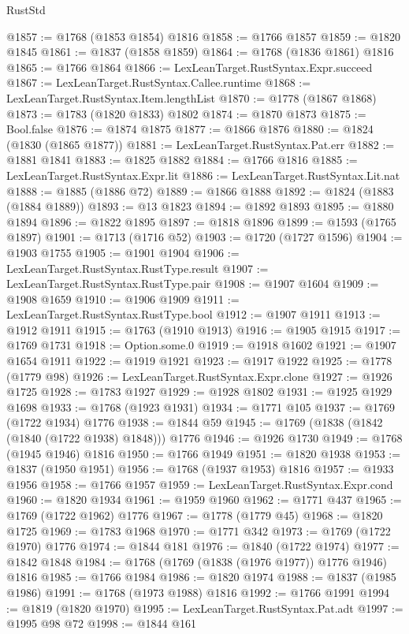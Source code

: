 \begin{lexlean}{RustStd}
\begin{coremodule}
@1857 := @1768 (@1853 @1854) @1816
@1858 := @1766 @1857
@1859 := @1820 @1845
@1861 := @1837 (@1858 @1859)
@1864 := @1768 (@1836 @1861) @1816
@1865 := @1766 @1864
@1866 := LexLeanTarget.RustSyntax.Expr.succeed
@1867 := LexLeanTarget.RustSyntax.Callee.runtime
@1868 := LexLeanTarget.RustSyntax.Item.lengthList
@1870 := @1778 (@1867 @1868)
@1873 := @1783 (@1820 @1833) @1802
@1874 := @1870 @1873
@1875 := Bool.false
@1876 := @1874 @1875
@1877 := @1866 @1876
@1880 := @1824 (@1830 (@1865 @1877))
@1881 := LexLeanTarget.RustSyntax.Pat.err
@1882 := @1881 @1841
@1883 := @1825 @1882
@1884 := @1766 @1816
@1885 := LexLeanTarget.RustSyntax.Expr.lit
@1886 := LexLeanTarget.RustSyntax.Lit.nat
@1888 := @1885 (@1886 @72)
@1889 := @1866 @1888
@1892 := @1824 (@1883 (@1884 @1889))
@1893 := @13 @1823
@1894 := @1892 @1893
@1895 := @1880 @1894
@1896 := @1822 @1895
@1897 := @1818 @1896
@1899 := @1593 (@1765 @1897)
@1901 := @1713 (@1716 @52)
@1903 := @1720 (@1727 @1596)
@1904 := @1903 @1755
@1905 := @1901 @1904
@1906 := LexLeanTarget.RustSyntax.RustType.result
@1907 := LexLeanTarget.RustSyntax.RustType.pair
@1908 := @1907 @1604
@1909 := @1908 @1659
@1910 := @1906 @1909
@1911 := LexLeanTarget.RustSyntax.RustType.bool
@1912 := @1907 @1911
@1913 := @1912 @1911
@1915 := @1763 (@1910 @1913)
@1916 := @1905 @1915
@1917 := @1769 @1731
@1918 := Option.some.{0}
@1919 := @1918 @1602
@1921 := @1907 @1654 @1911
@1922 := @1919 @1921
@1923 := @1917 @1922
@1925 := @1778 (@1779 @98)
@1926 := LexLeanTarget.RustSyntax.Expr.clone
@1927 := @1926 @1725
@1928 := @1783 @1927
@1929 := @1928 @1802
@1931 := @1925 @1929 @1698
@1933 := @1768 (@1923 @1931)
@1934 := @1771 @105
@1937 := @1769 (@1722 @1934) @1776
@1938 := @1844 @59
@1945 := @1769 (@1838 (@1842 (@1840 (@1722 @1938) @1848))) @1776
@1946 := @1926 @1730
@1949 := @1768 (@1945 @1946) @1816
@1950 := @1766 @1949
@1951 := @1820 @1938
@1953 := @1837 (@1950 @1951)
@1956 := @1768 (@1937 @1953) @1816
@1957 := @1933 @1956
@1958 := @1766 @1957
@1959 := LexLeanTarget.RustSyntax.Expr.cond
@1960 := @1820 @1934
@1961 := @1959 @1960
@1962 := @1771 @437
@1965 := @1769 (@1722 @1962) @1776
@1967 := @1778 (@1779 @45)
@1968 := @1820 @1725
@1969 := @1783 @1968
@1970 := @1771 @342
@1973 := @1769 (@1722 @1970) @1776
@1974 := @1844 @181
@1976 := @1840 (@1722 @1974)
@1977 := @1842 @1848
@1984 := @1768 (@1769 (@1838 (@1976 @1977)) @1776 @1946) @1816
@1985 := @1766 @1984
@1986 := @1820 @1974
@1988 := @1837 (@1985 @1986)
@1991 := @1768 (@1973 @1988) @1816
@1992 := @1766 @1991
@1994 := @1819 (@1820 @1970)
@1995 := LexLeanTarget.RustSyntax.Pat.adt
@1997 := @1995 @98 @72
@1998 := @1844 @161

\end{coremodule}
\end{lexlean}
